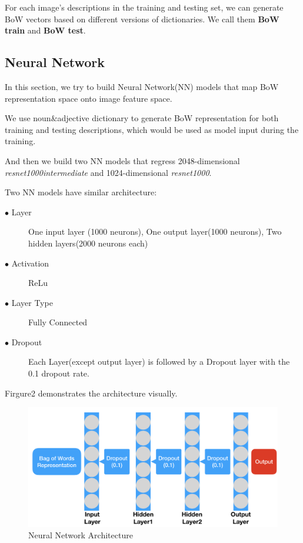 \documentclass{article}
\begin{document}
For each image's descriptions in the training and testing set, we can generate BoW vectors based on different versions of dictionaries. We call them \textbf{BoW train} and \textbf{BoW test}.

\subsection{Neural Network}

In this section, we try to build Neural Network(NN) models that map BoW representation space onto image feature space.

We use noun\&adjective dictionary to generate BoW representation for both training and testing descriptions, which would be used as model input during the training.

And then we build two NN models that regress 2048-dimensional \emph{resnet1000intermediate} and 1024-dimensional \emph{resnet1000}.

Two NN models have similar architecture:

\begin{description}
  \item[$\bullet$ Layer] One input layer (1000 neurons), One output layer(1000 neurons), Two hidden layers(2000 neurons each)
\end{description}
\begin{description}
  \item[$\bullet$ Activation] ReLu
\end{description}
\begin{description}
  \item[$\bullet$ Layer Type] Fully Connected
\end{description}
\begin{description}
  \item[$\bullet$ Dropout] Each Layer(except output layer) is followed by a Dropout layer with the 0.1 dropout rate.
\end{description}

Firgure2 demonstrates the architecture visually. 
\begin{figure}[h]
  \centering
  \includegraphics[width=\textwidth]{NeuralNetworkArchitecture}
  \caption{Neural Network Architecture}
\end{figure}
\end{document}

